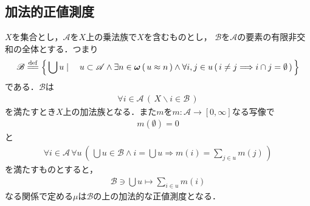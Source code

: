 \subsection{加法的正値測度}
		\begin{screen}
			\begin{thm}[加法的な正値測度空間の生成]\label{thm:forming_finitely_additive_class}
				$X$を集合とし，$\mathscr{A}$を$X$上の乗法族で$X$を含むものとし，
				$\mathscr{B}$を$\mathscr{A}$の要素の有限非交和の全体とする．つまり
				\begin{align}
					\mathscr{B} \defeq \Set{\bigcup u}{u \subset \mathscr{A} \wedge \exists n \in \Natural\,
					(\, u \eqp n\, ) \wedge \forall i,j \in u\, (\, i \neq j \Longrightarrow i \cap j = \emptyset\, )}
				\end{align}
				である．$\mathscr{B}$は
				\begin{align}
					\forall i \in \mathscr{A}\, (\, X\backslash i \in \mathscr{B}\, )
				\end{align}
				を満たすとき$X$上の加法族となる．また$m$を$m:\mathscr{A} \longrightarrow [0,\infty]$なる写像で
				\begin{align}
					m(\emptyset) = 0
				\end{align}
				と
				\begin{align}
					\forall i \in \mathscr{A}\, \forall u\, \left(\, 
					\bigcup u \in \mathscr{B} \wedge i = \bigcup u \Longrightarrow 
					m(i) = \sum_{j \in u} m(j)\, \right)
				\end{align}
				を満たすものとすると，
				\begin{align}
					\mathscr{B} \ni \bigcup u \longmapsto \sum_{i \in u} m(i)
				\end{align}
				なる関係で定める$\mu$は$\mathscr{B}$の上の加法的な正値測度となる．
			\end{thm}
		\end{screen}
		
